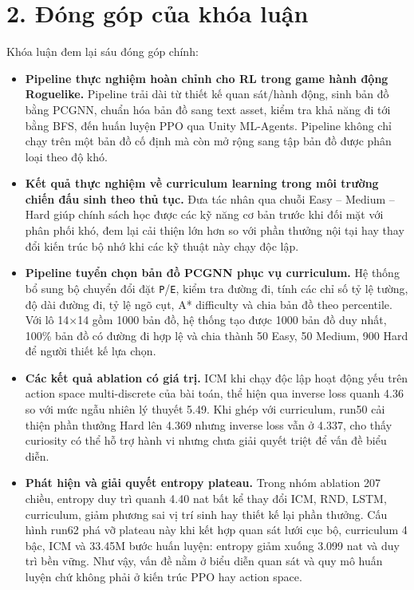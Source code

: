 \section*{2. Đóng góp của khóa luận}

Khóa luận đem lại sáu đóng góp chính:

\begin{itemize}
    \item \textbf{Pipeline thực nghiệm hoàn chỉnh cho RL trong game hành động Roguelike.} Pipeline trải dài từ thiết kế quan sát/hành động, sinh bản đồ bằng PCGNN, chuẩn hóa bản đồ sang text asset, kiểm tra khả năng đi tới bằng BFS, đến huấn luyện PPO qua Unity ML-Agents. Pipeline không chỉ chạy trên một bản đồ cố định mà còn mở rộng sang tập bản đồ được phân loại theo độ khó.

    \item \textbf{Kết quả thực nghiệm về curriculum learning trong môi trường chiến đấu sinh theo thủ tục.} Đưa tác nhân qua chuỗi Easy -- Medium -- Hard giúp chính sách học được các kỹ năng cơ bản trước khi đối mặt với phân phối khó, đem lại cải thiện lớn hơn so với phần thưởng nội tại hay thay đổi kiến trúc bộ nhớ khi các kỹ thuật này chạy độc lập.

    \item \textbf{Pipeline tuyển chọn bản đồ PCGNN phục vụ curriculum.} Hệ thống bổ sung bộ chuyển đổi đặt \texttt{P}/\texttt{E}, kiểm tra đường đi, tính các chỉ số tỷ lệ tường, độ dài đường đi, tỷ lệ ngõ cụt, A* difficulty và chia bản đồ theo percentile. Với lô 14$\times$14 gồm 1000 bản đồ, hệ thống tạo được 1000 bản đồ duy nhất, 100\% bản đồ có đường đi hợp lệ và chia thành 50 Easy, 50 Medium, 900 Hard để người thiết kế lựa chọn.

    \item \textbf{Các kết quả ablation có giá trị.} ICM khi chạy độc lập hoạt động yếu trên action space multi-discrete của bài toán, thể hiện qua inverse loss quanh 4.36 so với mức ngẫu nhiên lý thuyết 5.49. Khi ghép với curriculum, run50 cải thiện phần thưởng Hard lên 4.369 nhưng inverse loss vẫn ở 4.337, cho thấy curiosity có thể hỗ trợ hành vi nhưng chưa giải quyết triệt để vấn đề biểu diễn.

    \item \textbf{Phát hiện và giải quyết entropy plateau.} Trong nhóm ablation 207 chiều, entropy duy trì quanh 4.40 nat bất kể thay đổi ICM, RND, LSTM, curriculum, giảm phương sai vị trí sinh hay thiết kế lại phần thưởng. Cấu hình run62 phá vỡ plateau này khi kết hợp quan sát lưới cục bộ, curriculum 4 bậc, ICM và 33.45M bước huấn luyện: entropy giảm xuống 3.099 nat và duy trì bền vững. Như vậy, vấn đề nằm ở biểu diễn quan sát và quy mô huấn luyện chứ không phải ở kiến trúc PPO hay action space.


\end{itemize}
